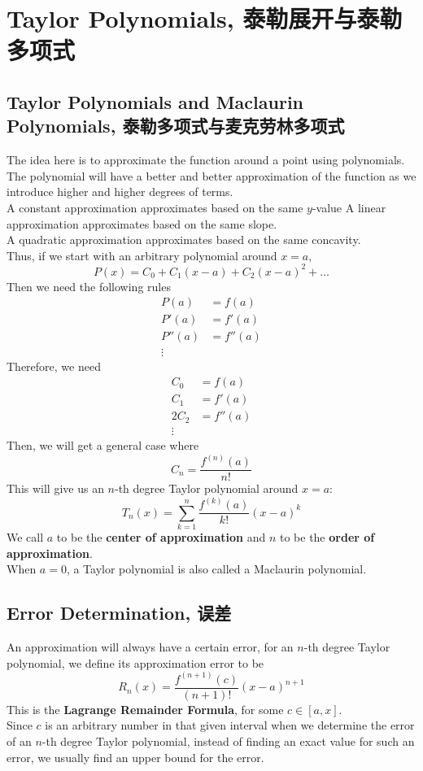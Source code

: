 \section{Taylor Polynomials, 泰勒展开与泰勒多项式}

\subsection{Taylor Polynomials and Maclaurin Polynomials, 泰勒多项式与麦克劳林多项式}
The idea here is to approximate the function around a point using polynomials. \\
The polynomial will have a better and better approximation of the function as we introduce higher and higher degrees of terms. \\
A constant approximation approximates based on the same $y$-value
A linear approximation approximates based on the same slope. \\
A quadratic approximation approximates based on the same concavity. \\
Thus, if we start with an arbitrary polynomial around $x=a$,
$$P(x) = C_0 + C_1(x-a) + C_2(x-a)^2 + \dots$$
Then we need the following rules
\begin{align*}
    P(a) &= f(a) \\
    P'(a) &= f'(a) \\
    P''(a) &= f''(a) \\
    \vdots
\end{align*}
Therefore, we need
\begin{align*}
    C_0 &= f(a) \\
    C_1 &= f'(a) \\
    2C_2 &= f''(a) \\
    \vdots
\end{align*}
Then, we will get a general case where
$$C_n = \frac{f^{(n)}(a)}{n!}$$
This will give us an $n$-th degree Taylor polynomial around $x=a$:
$$T_n(x) = \sum_{k = 1}^n \frac{f^{(k)}(a)}{k!}(x-a)^k$$
We call $a$ to be the \textbf{center of approximation} and $n$ to be the \textbf{order of approximation}. \\
When $a=0$, a Taylor polynomial is also called a Maclaurin polynomial.
\newpage

\subsection{Error Determination, 误差}
An approximation will always have a certain error, for an $n$-th degree Taylor polynomial, we define its approximation error to be
$$R_n(x) = \frac{f^{(n+1)}(c)}{(n+1)!}(x-a)^{n+1}$$
This is the \textbf{Lagrange Remainder Formula}, for some $c \in [a, x]$. \\
Since $c$ is an arbitrary number in that given interval when we determine the error of an $n$-th degree Taylor polynomial, instead of finding an exact value for such an error, we usually find an upper bound for the error.

